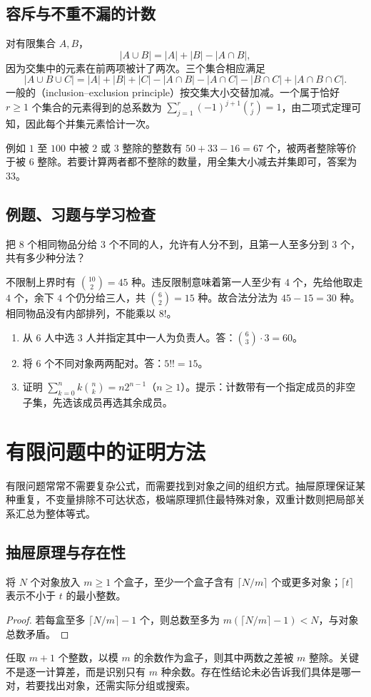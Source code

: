 \documentclass[UTF8]{ctexbook}
\begin{document}
\section{容斥与不重不漏的计数}
对有限集合 $A,B$，
\[
 |A\cup B|=|A|+|B|-|A\cap B|,
\]
因为交集中的元素在前两项被计了两次。三个集合相应满足
\[
 |A\cup B\cup C|=|A|+|B|+|C|
 -|A\cap B|-|A\cap C|-|B\cap C|+|A\cap B\cap C|.
\]
一般的（inclusion--exclusion principle）按交集大小交替加减。一个属于恰好 $r\ge1$ 个集合的元素得到的总系数为 $\sum_{j=1}^r(-1)^{j+1}\binom rj=1$，由二项式定理可知，因此每个并集元素恰计一次。

例如 $1$ 至 $100$ 中被 $2$ 或 $3$ 整除的整数有 $50+33-16=67$ 个，被两者整除等价于被 $6$ 整除。若要计算两者都不整除的数量，用全集大小减去并集即可，答案为 $33$。

\section{例题、习题与学习检查}
\begin{example}
把 $8$ 个相同物品分给 $3$ 个不同的人，允许有人分不到，且第一人至多分到 $3$ 个，共有多少种分法？
\end{example}
\begin{solve}
不限制上界时有 $\binom{10}2=45$ 种。违反限制意味着第一人至少有 $4$ 个，先给他取走 $4$ 个，余下 $4$ 个仍分给三人，共 $\binom62=15$ 种。故合法分法为 $45-15=30$ 种。相同物品没有内部排列，不能乘以 $8!$。
\end{solve}
\begin{enumerate}
\item 从 $6$ 人中选 $3$ 人并指定其中一人为负责人。答：$\binom63\cdot3=60$。
\item 将 $6$ 个不同对象两两配对。答：$5!!=15$。
\item 证明 $\sum_{k=0}^n k\binom nk=n2^{n-1}$（$n\ge1$）。提示：计数带有一个指定成员的非空子集，先选该成员再选其余成员。
\end{enumerate}

\chapter{有限问题中的证明方法}
\label{chap:em-discrete}
有限问题常常不需要复杂公式，而需要找到对象之间的组织方式。抽屉原理保证某种重复，不变量排除不可达状态，极端原理抓住最特殊对象，双重计数则把局部关系汇总为整体等式。

\section{抽屉原理与存在性}
\begin{theorem}[抽屉原理]
将 $N$ 个对象放入 $m\ge1$ 个盒子，至少一个盒子含有 $\lceil N/m\rceil$ 个或更多对象；$\lceil t\rceil$ 表示不小于 $t$ 的最小整数。
\end{theorem}
\begin{proof}
若每盒至多 $\lceil N/m\rceil-1$ 个，则总数至多为 $m(\lceil N/m\rceil-1)<N$，与对象总数矛盾。
\end{proof}
任取 $m+1$ 个整数，以模 $m$ 的余数作为盒子，则其中两数之差被 $m$ 整除。关键不是逐一计算差，而是识别只有 $m$ 种余数。存在性结论未必告诉我们具体是哪一对，若要找出对象，还需实际分组或搜索。
\end{document}
